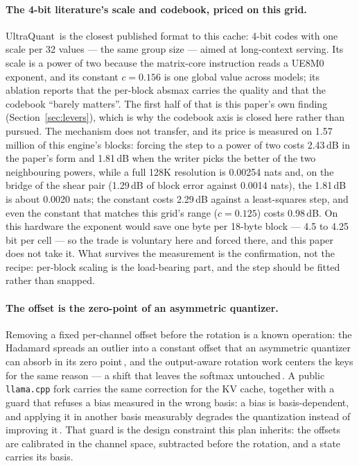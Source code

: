\documentclass[10pt,twocolumn]{article}
\begin{document}
\paragraph{The 4-bit literature's scale and codebook, priced on this grid.} UltraQuant\,\cite{ultraquant} is the closest published format to this cache: 4-bit codes with one scale per 32 values --- the same group size --- aimed at long-context serving. Its scale is a power of two because the matrix-core instruction reads a UE8M0 exponent, and its constant $c = 0.156$ is one global value across models; its ablation reports that the per-block absmax carries the quality and that the codebook ``barely matters''. The first half of that is this paper's own finding (Section~\ref{sec:levers}), which is why the codebook axis is closed here rather than pursued. The mechanism does not transfer, and its price is measured on 1.57 million of this engine's blocks: forcing the step to a power of two costs 2.43\,dB in the paper's form and 1.81\,dB when the writer picks the better of the two neighbouring powers, while a full 128K resolution is 0.00254 nats and, on the bridge of the shear pair (1.29\,dB of block error against 0.0014 nats), the 1.81\,dB is about 0.0020 nats; the constant costs 2.29\,dB against a least-squares step, and even the constant that matches this grid's range ($c = 0.125$) costs 0.98\,dB. On this hardware the exponent would save one byte per 18-byte block --- 4.5 to 4.25 bit per cell --- so the trade is voluntary here and forced there, and this paper does not take it. What survives the measurement is the confirmation, not the recipe: per-block scaling is the load-bearing part, and the step should be fitted rather than snapped.

\paragraph{The offset is the zero-point of an asymmetric quantizer.} Removing a fixed per-channel offset before the rotation is a known operation: the Hadamard spreads an outlier into a constant offset that an asymmetric quantizer can absorb in its zero point\,\cite{offq}, and the output-aware rotation work centers the keys for the same reason --- a shift that leaves the softmax untouched\,\cite{optr}. A public \texttt{llama.cpp} fork carries the same correction for the KV cache, together with a guard that refuses a bias measured in the wrong basis: a bias is basis-dependent, and applying it in another basis measurably degrades the quantization instead of improving it\,\cite{llamacpp-center}. That guard is the design constraint this plan inherits: the offsets are calibrated in the channel space, subtracted before the rotation, and a state carries its basis.
\end{document}
